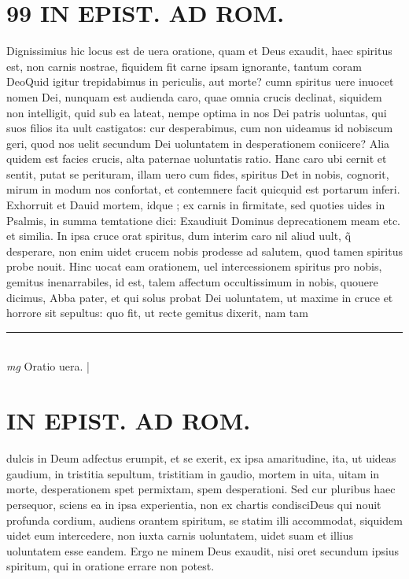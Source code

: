 \documentclass{article}
\begin{document}
\begin{pages}
\section*{99 IN EPIST. AD ROM.  }
\marginpar{[ p.]}\pstart Dignissimius hic locus est de uera oratione, quam et Deus exaudit, haec spiritus est, non carnis nostrae, fiquidem fit carne ipsam ignorante, tantum coram DeoQuid igitur trepidabimus in periculis, aut morte? cumn spiritus uere inuocet nomen Dei, nunquam est audienda caro, quae omnia crucis declinat, siquidem non intelligit, quid sub ea lateat, nempe optima in nos Dei patris uoluntas, qui suos filios ita uult castigatos: cur desperabimus, cum non uideamus id nobiscum geri, quod nos uelit secundum Dei uoluntatem in desperationem coniicere? Alia quidem est facies crucis, alta paternae uoluntatis ratio. Hanc caro ubi cernit et sentit, putat se perituram, illam uero cum fides, spiritus Det in nobis, cognorit, mirum in modum nos confortat, et contemnere facit quicquid est portarum inferi. Exhorruit et Dauid mortem, idque ; ex carnis in firmitate, sed quoties uides in Psalmis, in summa temtatione dici: Exaudiuit Dominus deprecationem meam etc. et similia. In ipsa cruce orat spiritus, dum interim caro nil aliud uult, q̃ desperare, non enim uidet crucem nobis prodesse ad salutem, quod tamen spiritus probe nouit. Hinc uocat eam orationem, uel intercessionem spiritus pro nobis, gemitus inenarrabiles, id est, talem affectum occultissimum in nobis, quouere dicimus, Abba pater, et qui solus probat Dei uoluntatem, ut maxime in cruce et horrore sit sepultus: quo fit, ut recte gemitus dixerit, nam tam  \pend
\vspace{0.5cm}\noindent
\vspace{0.2cm}\rule{1cm}{0.2pt}\\ 
\hspace{0.2cm}\textit{mg}
\footnotesize Oratio uera.  
\normalsize| 
\section*{IN EPIST. AD ROM.  }
\marginpar{[ p.102 ]}\pstart dulcis in Deum adfectus erumpit, et se exerit, ex ipsa amaritudine, ita, ut uideas gaudium, in tristitia sepultum, tristitiam in gaudio, mortem in uita, uitam in morte, desperationem spet permixtam, spem desperationi. Sed cur pluribus haec persequor, sciens ea in ipsa experientia, non ex chartis condisci\pend\pstart Deus qui nouit profunda cordium, audiens orantem spiritum, se statim illi accommodat, siquidem uidet eum intercedere, non iuxta carnis uoluntatem, uidet suam et illius uoluntatem esse eandem. Ergo ne minem Deus exaudit, nisi oret secundum ipsius spiritum, qui in oratione errare non potest.   \pend
{}
{}

\end{pages}
\end{document}
